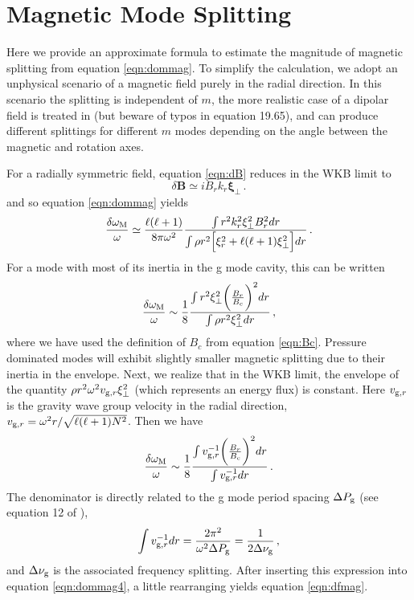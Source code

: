 \appendix

\section{Magnetic Mode Splitting}
\label{magmode}

Here we provide an approximate formula to estimate the magnitude of magnetic splitting from equation \ref{eqn:dommag}. To simplify the calculation, we adopt an unphysical scenario of a magnetic field purely in the radial direction. In this scenario the splitting is independent of $m$, the more realistic case of a dipolar field is treated in \cite{Unno_1989} (but beware of typos in equation 19.65), and can produce different splittings for different $m$ modes depending on the angle between the magnetic and rotation axes.

For a radially symmetric field, equation \ref{eqn:dB} reduces in the WKB limit to 
\begin{equation}
\delta {\boldsymbol B} \simeq i B_r k_r \boldsymbol{\xi}_\perp \, .
\end{equation}
and so equation \ref{eqn:dommag} yields
\begin{equation}
\label{eqn:dommag2}
\frac{\delta \omega_{\rm M}}{\omega} \simeq \frac{\ell(\ell+1)}{8 \pi \omega^2 } \frac{\int r^2 k_r^2 \xi_\perp^2 B_r^2 d r }{\int  \rho r^2 \Big[ \xi_r^2 + \ell(\ell+1) \xi_\perp^2 \Big] d r }\, .
\end{equation}
For a mode with most of its inertia in the g mode cavity, this can be written 
\begin{equation}
\label{eqn:dommag3}
\frac{\delta \omega_{\rm M}}{\omega} \sim \frac{1}{8} \frac{\int r^2 \xi_\perp^2 \bigg(\frac{B_r}{B_c}\bigg)^2 d r }{\int \rho r^2 \xi_\perp^2 d r }\, ,
\end{equation}
where we have used the definition of $B_c$ from equation \ref{eqn:Bc}. Pressure dominated modes will exhibit slightly smaller magnetic splitting due to their inertia in the envelope. Next, we realize that in the WKB limit, the envelope of the quantity $\rho r^2 \omega^2 v_{{\rm g},r} \xi_\perp^2$ (which represents an energy flux) is constant. Here $v_{{\rm g},r}$ is the gravity wave group velocity in the radial direction, $v_{{\rm g},r} = \omega^2 r/\sqrt{\ell(\ell+1)N^2}$. Then we have
\begin{equation}
\label{eqn:dommag4}
\frac{\delta \omega_{\rm M}}{\omega} \sim \frac{1}{8} \frac{\int v_{{\rm g},r}^{-1} \bigg(\frac{B_r}{B_c}\bigg)^2 d r }{\int v_{{\rm g},r}^{-1} d r }\, .
\end{equation}
The denominator is directly related to the g mode period spacing $\Delta P_{\rm g}$ (see equation 12 of \cite{Chaplin_2013}),
\begin{equation}
\label{eqn:dpg}
\int v_{{\rm g},r}^{-1} dr = \frac{2 \pi^2}{\omega^2 \Delta P_{\rm g}} = \frac{1}{2 \Delta \nu_{\rm g}} \, ,
\end{equation}
and $\Delta \nu _{\rm g}$ is the associated frequency splitting. After inserting this expression into equation \ref{eqn:dommag4}, a little rearranging yields equation \ref{eqn:dfmag}.

